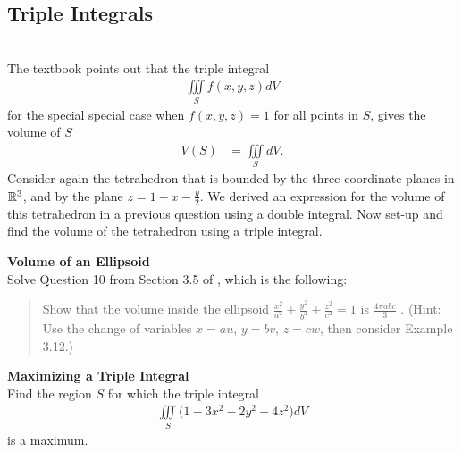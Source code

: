 
\subsection{Triple Integrals}
  
\BEN
\item %
 \\
The textbook points out that the triple integral 
\begin{align*}
  \iiint\limits_S f(x,y,z) dV
\end{align*}
for the special special case when $f(x,y,z) = 1$ for all points in $S$, gives the volume of $S$
\begin{align*}
  V(S) &= \iiint\limits_S dV.
\end{align*}
Consider again the tetrahedron that is bounded by the three coordinate planes in $\mathbb{R}^3$, and by the plane $z = 1 - x - \frac{y}{2}$. We derived an expression for the volume of this tetrahedron in a previous question using a double integral. Now set-up and find the volume of the tetrahedron using a triple integral.
\item %
\textbf{Volume of an Ellipsoid}\\
Solve Question 10 from Section 3.5 of \VCT, which is the following: 
\begin{quotation}
\noindent
Show that the volume inside the ellipsoid $\frac{x^2}{a^2} + \frac{y^2}{b^2} + \frac{z^2}{c^2} = 1$ is $\frac{4\pi abc}{3}$ . (Hint: Use the
change of variables $x = au$, $y = bv$, $z = cw$, then consider Example 3.12.)
\end{quotation}
\item %
\textbf{Maximizing a Triple Integral}\\
Find the region $S$ for which the triple integral
\begin{align*}
  \iiint\limits_{S} \big(1 - 3x^2 - 2y^2 - 4z^2 \big)dV
\end{align*}
is a maximum. 


